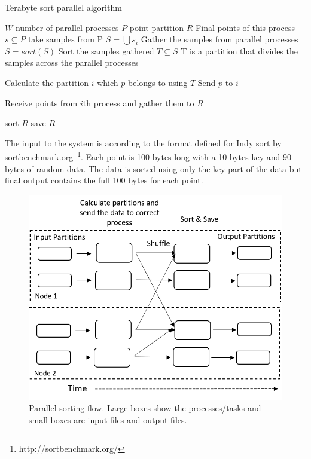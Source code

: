 \documentclass[conference]{IEEEtran}
\begin{document}
\begin{algorithm}
   \caption{Terabyte sort parallel algorithm}
   \footnotesize
   \label{tearasort_algo}
    \begin{algorithmic}[1]
    \State $W$ number of parallel processes
    \State $P$ point partition
    \State $R$ Final points of this process
    \State $s \subseteq P$ take samples from P
    \State $S = \bigcup s_i$ Gather the samples from parallel processes
    \State $S = sort (S)$ Sort the samples gathered
    \State $T \subseteq S$ T is a partition that divides the samples across the parallel processes 
    
        \State Calculate the partition $i$ which $p$ belongs to using $T$
        \State Send $p$ to $i$ 
    \EndFor
            
        \State Receive points from $i$th process and gather them to $R$
    \EndFor
    
    \State sort $R$
    \State save $R$                     
\end{algorithmic}
\end{algorithm}

The input to the system is according to the format defined for Indy sort by sortbenchmark.org~\footnote{http://sortbenchmark.org/}. Each point is 100 bytes long with a 10 bytes key and 90 bytes of random data. The data is sorted using only the key part of the data but final output contains the full 100 bytes for each point.

\begin{figure}
    \centering
    \includegraphics[width=0.8\columnwidth]{images/terasort_partition.png}
    \caption{Parallel sorting flow. Large boxes show the processes/tasks and small boxes are input files and output files.}
    \label{fig:tera_shuffle}
\end{figure}
\end{document}
